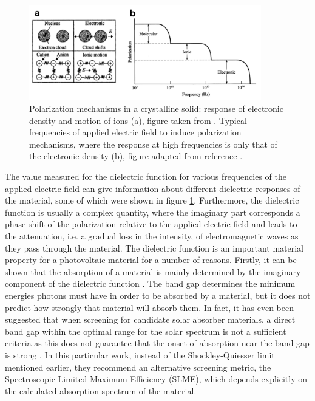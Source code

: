 \begin{figure}[h!]
  \centering
    \includegraphics[width=0.9\textwidth]{figures/dielectric.png}
    \caption{Polarization mechanisms in a crystalline solid: response of electronic density and motion of ions (a), figure taken from . Typical frequencies of applied electric field to induce polarization mechanisms, where the response at high frequencies is only that of the electronic density (b), figure adapted from reference .}
  \label{dielectric}
\end{figure}

The value measured for the dielectric function for various frequencies of the applied electric field can give information about different dielectric responses of the material, some of which were shown in figure \ref{dielectric}. Furthermore, the dielectric function is usually a complex quantity, where the imaginary part corresponds a phase shift of the polarization relative to the applied electric field and leads to the attenuation, i.e. a gradual loss in the intensity, of electromagnetic waves as they pass through the material. The dielectric function is an important material property for a photovoltaic material for a number of reasons. Firstly, it can be shown that the absorption of a material is mainly determined by the imaginary component of the dielectric function \cite{dielectric_func_book1}. The band gap determines the minimum energies photons must have in order to be absorbed by a material, but it does not predict how strongly that material will absorb them. 
In fact, it has even been suggested that when screening for candidate solar absorber materials, a direct band gap within the optimal range for the solar spectrum is not a sufficient criteria as this does not guarantee that the onset of absorption near the band gap is strong \cite{SLME}. In this particular work, instead of the Shockley-Quiesser limit mentioned earlier, they recommend an alternative screening metric, the Spectroscopic Limited Maximum Efficiency (SLME), which depends explicitly on the calculated absorption spectrum of the material.

